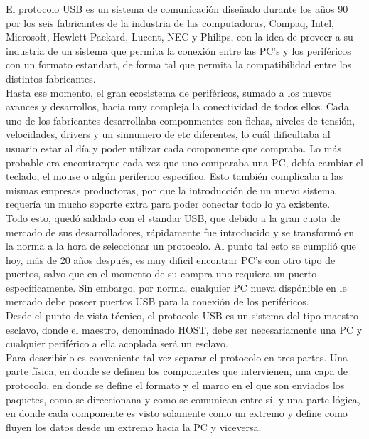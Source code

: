 El protocolo USB es un sistema de comunicación diseñado durante los años 90 por los seis fabricantes de la industria de las computadoras, Compaq, Intel, Microsoft, Hewlett-Packard, Lucent, NEC y Philips, con la idea de proveer a su industria de un sistema que permita la conexión entre las PC's y los periféricos con un formato estandart, de forma tal que permita la compatibilidad entre los distintos fabricantes.\\

Hasta ese momento, el gran ecosistema de periféricos, sumado a los nuevos avances y desarrollos, hacia muy compleja la conectividad de todos ellos. Cada uno de los fabricantes desarrollaba componmentes con fichas, niveles de tensión, velocidades, drivers y un sinnumero de etc diferentes, lo cuál dificultaba al usuario estar al día y poder utilizar cada componente que compraba. Lo más probable era encontrarque cada vez que uno comparaba una PC, debía cambiar el teclado, el mouse o algún periferico específico. Esto también complicaba a las mismas empresas productoras, por que la introducción de un nuevo sistema requería un mucho soporte extra para poder conectar todo lo ya existente.\\

Todo esto, quedó saldado con el standar USB, que debido a la gran cuota de mercado de sus desarrolladores, rápidamente fue introducido y se transformó en la norma a la hora de seleccionar un protocolo. Al punto tal esto se cumplió que hoy, más de 20 años después, es muy dificil encontrar PC's con otro tipo de puertos, salvo que en el momento de su compra uno requiera un puerto específicamente. Sin embargo, por norma, cualquier PC nueva dispónible en le mercado debe poseer puertos USB para la conexión de los periféricos.\\

Desde el punto de vista técnico, el protocolo USB es un sistema del tipo maestro-esclavo, donde el maestro, denominado HOST, debe ser necesariamente una PC y cualquier periférico a ella acoplada será un esclavo.\\

Para describirlo es conveniente tal vez separar el protocolo en tres partes. Una parte física, en donde se definen los componentes que intervienen, una capa de protocolo, en donde se define el formato y el marco en el que son enviados los paquetes, como se direccionana y como se comunican entre sí, y una parte lógica, en donde cada componente es visto solamente como un extremo y define como fluyen los datos desde un extremo hacia la PC y viceversa.\\

